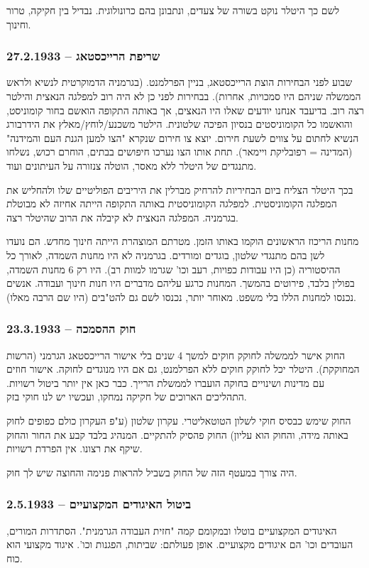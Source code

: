\documentclass[a4paper]{book}
\begin{document}
	לשם כך היטלר נוקט בשורה של צעדים, ונתבונן בהם כרונולוגית. נבדיל בין חקיקה, טרור וחינוך. 
	
	\subsubsection{27.2.1933 – שריפת הרייכסטאג}
	שבוע לפני הבחירות הוצת הרייכסטאג, בניין הפרלמנט. (בגרמניה הדמוקרטית לנשיא ולראש הממשלה שניהם היו סמכויות, אחרות). בבחירות לפני כן לא היה רוב למפלגה הנאצית והילטר רצה רוב. בדיעבד אנחנו יודעים שאלו היו הנאצים, אך באותה התקופה הואשם בחור קומוניסט, והואשמו כל הקומוניסטים בנסיון הפיכה שלטונית. הילטר משכנע/לוחץ/מאלץ את הידרבורג הנשיא לחתום על צווים לשעת חירום. יוצא צו חירום שנקרא "הצו למען הגנת העם והמידנה" (המדינה = רפובליקת ויימאר). תחת אותו הצו נערכו חיפושים בבתים, הוחרם רכוש, נשלחו מתנגדים של היטלר ללא מאסר, הוטלה צנזורה על העיתונים ועוד. 
	
	בכך היטלר הצליח ביום הבחיריות להרחיק מברלין את היריבים הפוליטיים שלו ולהחליש את המפלגה הקומוניסטית. למפלגה הקומוניסטית באותה התקופה הייתה אחיזה לא מבוטלת בגרמניה. המפלגה הנאצית לא קיבלה את הרוב שהיטלר רצה. 
	
	מחנות הריכוז הראשונים הוקמו באותו הזמן. מטרתם המוצהרת הייתה חינוך מחדש. הם נועדו לשן בהם מתנגדי שלטון, בוגדים ומורדים. בגרמניה לא היו מחנות השמדה, לאורך כל ההיסטוריה (כן היו עבודות כפויות, רעב וכו' שגרמו למוות רב). היו רק 6 מחנות השמדה, בפולין בלבד, פירוטים בהמשך. המחנות כרגע עליהם מדברים היו חנות חינוך ועבודה. אנשים נכנסו למחנות הללו בלי משפט. מאוחר יותר, נכנסו לשם גם להט"בים (היו שם הרבה מאלו). 
	
	\subsubsection{23.3.1933 – חוק ההסמכה}
	החוק אישר לממשלה לחוקק חוקים למשך 4 שנים בלי אישור הרייכסטאג הגרמני (הרשות המחוקקת). היטלר יכל לחוקק חוקים ללא הפרלמנט, גם אם היו מנוגדים לחוקה. אישור חוזים עם מדינות ושינויים בחוקה הועברו לממשלת הרייך. כבר כאן אין יותר ביטול רשויות. התהליכים הארוכים של חקיקה נמחקו, ועכשיו יש לנו חוקי בזק. 
	
	החוק שימש כבסיס חוקי לשלון הטוטאליטרי. עקרון שלטון (ע"פ העקרון כולם כפופים לחוק באותה מידה, והחוק הוא עליון) החוק פהסיק להתקיים. המנהיג בלבד קבע את החור והחוק שיקף את רצונו. אין הפרדת רשויות. 
	
	היה צורך במעטף הזה של החוק בשביל להראות פנימה והחוצה שיש לך חוק. 
	
	\subsubsection{2.5.1933 -- ביטול האיגודים המקצועיים}
	האיגודים המקצועיים בוטלו ובמקומם קמה "חזית העבודה הגרמנית". הסתדרות המורים, העובדים וכו' הם איגודים מקצועיים. אופן פעולתם: שביתות, הפגנות וכו'. איגוד מקצועי הוא כוח. 
	
\end{document}
